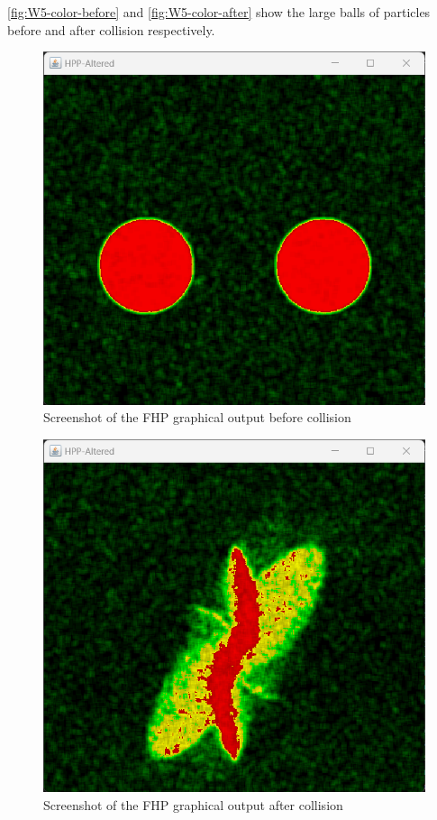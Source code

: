 \autoref{fig:W5-color-before} and \autoref{fig:W5-color-after} show the large balls of particles before and after collision respectively.

\begin{figure}[H] 
    \centering
    \includegraphics[width=0.49\columnwidth]{Figures/Week 5/Color/FHP Color 1.png}
    \caption{Screenshot of the FHP graphical output before collision}
    \label{fig:W5-color-before}
\end{figure}
\begin{figure}[H] 
    \centering    
    \includegraphics[width=0.49\columnwidth]{Figures/Week 5/Color/FHP Color 2.png}
    \caption{Screenshot of the FHP graphical output after collision}
    \label{fig:W5-color-after}
\end{figure}

  



\newpage
